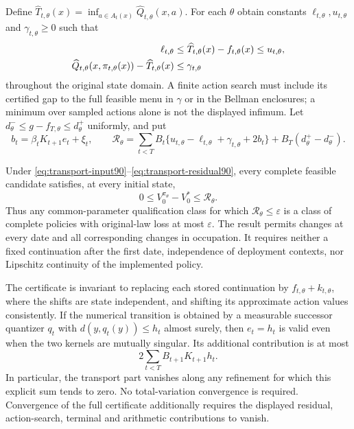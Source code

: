 Define $\widehat T_{t,\theta}(x)=\inf_{a\in A_t(x)}\widehat Q_{t,\theta}(x,a)$. For each $\theta$ obtain constants $\ell_{t,\theta},u_{t,\theta}$ and $\gamma_{t,\theta}\ge0$ such that
\begin{align}\label{eq:transport-residual90}
 \ell_{t,\theta}&\le\widehat T_{t,\theta}(x)-f_{t,\theta}(x)
                    \le u_{t,\theta},\notag\\
 \widehat Q_{t,\theta}(x,\pi_{t,\theta}(x))
       -\widehat T_{t,\theta}(x)&\le\gamma_{t,\theta}
\end{align}
throughout the original state domain. A finite action search must include its certified gap to the full feasible menu in $\gamma$ or in the Bellman enclosures; a minimum over sampled actions alone is not the displayed infimum. Let $d^-_\theta\le g-f_{T,\theta}\le d^+_\theta$ uniformly, and put
\[
 b_t=\beta_tK_{t+1}e_t+\xi_t,\qquad
 \mathcal R_\theta=
 \sum_{t<T}B_t\{u_{t,\theta}-\ell_{t,\theta}
                  +\gamma_{t,\theta}+2b_t\}
       +B_T(d^+_\theta-d^-_\theta).
\]

\begin{theorem}\label{thm:transport90}
Under \eqref{eq:transport-input90}--\eqref{eq:transport-residual90}, every complete feasible candidate satisfies, at every initial state,
\begin{equation}\label{eq:transport-loss90}
 0\le V_0^{\pi_\theta}-V_0^*\le\mathcal R_\theta.
\end{equation}
Thus any common-parameter qualification class for which $\mathcal R_\theta\le\varepsilon$ is a class of complete policies with original-law loss at most $\varepsilon$. The result permits changes at every date and all corresponding changes in occupation. It requires neither a fixed continuation after the first date, independence of deployment contexts, nor Lipschitz continuity of the implemented policy.

The certificate is invariant to replacing each stored continuation by $f_{t,\theta}+k_{t,\theta}$, where the shifts are state independent, and shifting its approximate action values consistently. If the numerical transition is obtained by a measurable successor quantizer $q_t$ with $d(y,q_t(y))\le h_t$ almost surely, then $e_t=h_t$ is valid even when the two kernels are mutually singular. Its additional contribution is at most
\begin{equation}\label{eq:transport-quantization90}
 2\sum_{t<T}B_{t+1}K_{t+1}h_t.
\end{equation}
In particular, the transport part vanishes along any refinement for which this explicit sum tends to zero. No total-variation convergence is required. Convergence of the full certificate additionally requires the displayed residual, action-search, terminal and arithmetic contributions to vanish.
\end{theorem}


